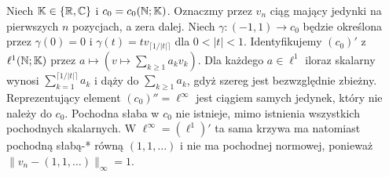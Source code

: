 \begin{przyklad}
\label{ex:scalar-not-weak-derivative14}
Niech $\mathbb K\in\{\mathbb R,\mathbb C\}$ i $c_0=c_0(\mathbb N;\mathbb K)$.
Oznaczmy przez $v_n$ ciąg mający jedynki na pierwszych
$n$ pozycjach, a zera dalej. Niech $\gamma:(-1,1)\to c_0$ będzie określona przez
$\gamma(0)=0$ i $\gamma(t)=t v_{\lceil1/|t|\rceil}$ dla $0<|t|<1$.
Identyfikujemy $(c_0)'$ z $\ell^1(\mathbb N;\mathbb K)$ przez
$a\mapsto(v\mapsto\sum_{k\ge1}a_kv_k)$. Dla każdego
$a\in\ell^1$ iloraz skalarny wynosi
$\sum_{k=1}^{\lceil1/|t|\rceil} a_k$ i dąży do
$\sum_{k\ge1}a_k$, gdyż szereg jest bezwzględnie zbieżny. Reprezentujący element $(c_0)''=\ell^\infty$
jest ciągiem samych jedynek, który nie należy do $c_0$.
Pochodna słaba w $c_0$ nie istnieje, mimo istnienia
wszystkich pochodnych skalarnych. W $\ell^\infty=(\ell^1)'$
ta sama krzywa ma natomiast pochodną słabą-* równą
$(1,1,\ldots)$ i nie ma pochodnej normowej, ponieważ
$\|v_n-(1,1,\ldots)\|_\infty=1$.
\end{przyklad}

